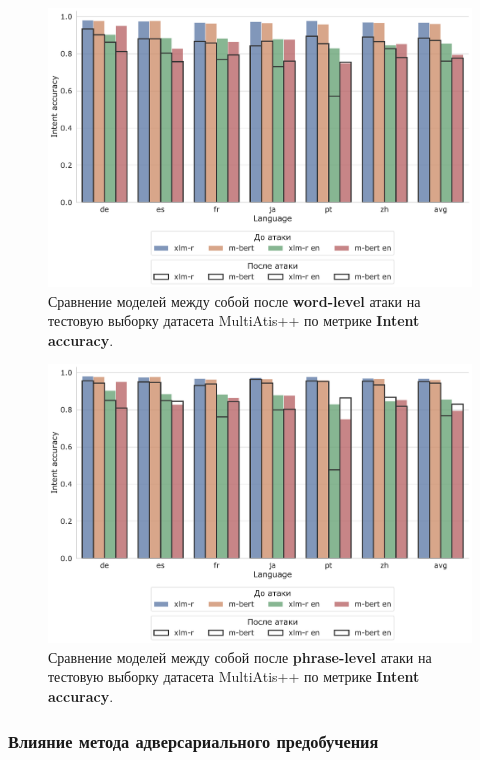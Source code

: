 \begin{figure}[H]
    \centering
    \includegraphics[width=\textwidth]{images/3}
    \caption{Сравнение моделей между собой после \textbf{word-level} атаки на тестовую выборку датасета MultiAtis++ по метрике \textbf{Intent accuracy}.}\label{fig:figure3}
\end{figure}

\begin{figure}[H]
    \centering
    \includegraphics[width=\textwidth]{images/6}
    \caption{Сравнение моделей между собой после \textbf{phrase-level} атаки на тестовую выборку датасета MultiAtis++ по метрике \textbf{Intent accuracy}.}\label{fig:figure6}
\end{figure}


\subsubsection{Влияние метода адверсариального предобучения}

